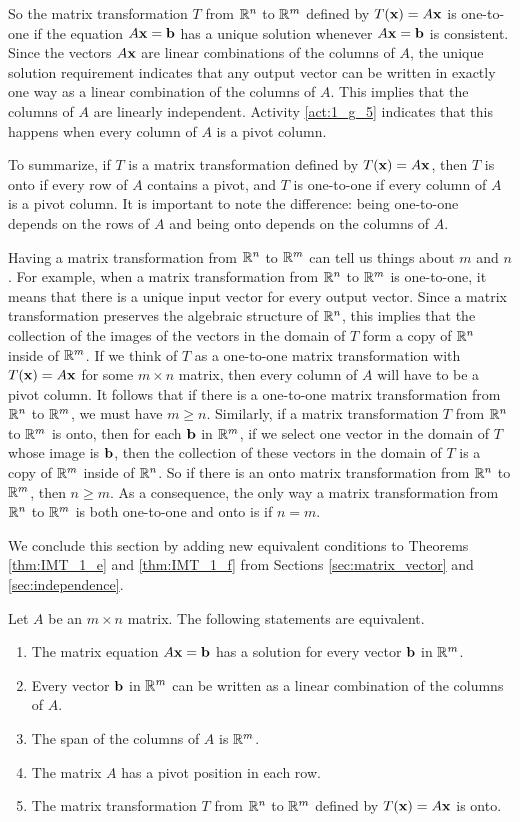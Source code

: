 So the matrix transformation $T$ from $\mathbb{R}^n$ to $\mathbb{R}^m$ defined by $T(\mathbf{x}) = A\mathbf{x}$ is one-to-one if the equation $A \mathbf{x} = \mathbf{b}$ has a unique solution whenever $A \mathbf{x} = \mathbf{b}$ is consistent. Since the vectors $A\mathbf{x}$ are linear combinations of the columns of $A$, the unique solution requirement indicates that any output vector can be written in exactly one way as a linear combination of the columns of $A$. This implies that the columns of $A$ are linearly independent. Activity \ref{act:1_g_5} indicates that this happens when every column of $A$ is a pivot column. 


To summarize, if $T$ is a matrix transformation defined by $T(\mathbf{x}) = A \mathbf{x}$, then $T$ is onto if every row of $A$ contains a pivot, and $T$ is one-to-one if every column of $A$ is a pivot column. It is important to note the difference: being one-to-one depends on the rows of $A$ and being onto depends on the columns of $A$. 


Having a matrix transformation from $\mathbb{R}^n$ to $\mathbb{R}^m$ can tell us things about $m$ and $n$. For example, when a matrix transformation from $\mathbb{R}^n$ to $\mathbb{R}^m$ is one-to-one, it means that there is a unique input vector for every output vector. Since a matrix transformation preserves the algebraic structure of $\mathbb{R}^n$, this implies that the collection of the images of the vectors in the domain of $T$ form a copy of $\mathbb{R}^n$ inside of $\mathbb{R}^m$. If we think of $T$ as a one-to-one matrix transformation with $T(\mathbf{x}) = A \mathbf{x}$ for some $m \times n$ matrix, then every column of $A$ will have to be a pivot column. It follows that if there is a one-to-one matrix transformation from $\mathbb{R}^n$ to $\mathbb{R}^m$, we must have $m \geq n$. Similarly, if a matrix transformation $T$ from $\mathbb{R}^n$ to $\mathbb{R}^m$ is onto, then for each $\mathbf{b}$ in $\mathbb{R}^m$, if we select one vector in the domain of $T$ whose image is $\mathbf{b}$, then the collection of these vectors in the domain of $T$ is a copy of $\mathbb{R}^m$ inside of $\mathbb{R}^n$. So if there is an onto matrix transformation from $\mathbb{R}^n$ to $\mathbb{R}^m$, then $n \geq m$. As a consequence, the only way a matrix transformation from $\mathbb{R}^n$ to $\mathbb{R}^m$ is both one-to-one and onto is if $n = m$. 

We conclude this section by adding new equivalent conditions to Theorems \ref{thm:IMT_1_e}  and \ref{thm:IMT_1_f} from Sections \ref{sec:matrix_vector} and \ref{sec:independence}.

\begin{theorem} \label{thm:IMT_1_g_a}Let $A$ be an $m \times n$ matrix. The following statements are equivalent.
    \begin{enumerate}
    \item The matrix equation $A \mathbf{x} = \mathbf{b}$ has a solution for every vector $\mathbf{b}$ in $\mathbb{R}^m$.
    \item Every vector $\mathbf{b}$ in $\mathbb{R}^m$ can be written as a linear combination of the columns of $A$.
    \item The span of the columns of $A$ is $\mathbb{R}^m$.
    \item The matrix $A$ has a pivot position in each row.
    \item The matrix transformation $T$ from $\mathbb{R}^n$ to $\mathbb{R}^m$ defined by $T(\mathbf{x}) = A\mathbf{x}$ is onto.
    \end{enumerate}
\end{theorem}


